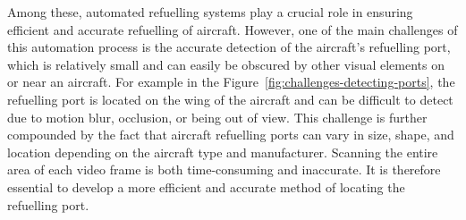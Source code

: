 \documentclass[12pt,oneside]{book} %
\begin{document}
Among these, automated refuelling systems play a crucial role in ensuring
efficient and accurate refuelling of aircraft. However, one of the main
challenges of this automation process is the accurate detection of the
aircraft's refuelling port, which is relatively small and can easily be
obscured by other visual elements on or near an aircraft. For example in the
Figure~\ref{fig:challenges-detecting-ports}, the refuelling port is located on
the wing of the aircraft and can be difficult to detect due to motion blur,
occlusion, or being out of view. This challenge is further compounded by the
fact that aircraft refuelling ports can vary in size, shape, and location
depending on the aircraft type and manufacturer. Scanning the entire area of
each video frame is both time-consuming and inaccurate. It is therefore
essential to develop a more efficient and accurate method of locating the
refuelling port. 
\end{document}
